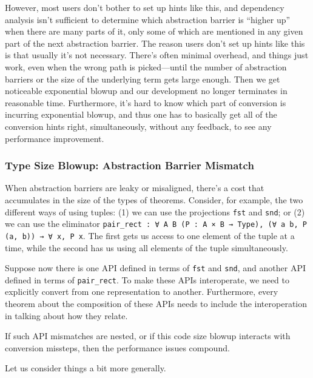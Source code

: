 However, most users don't bother to set up hints like this, and dependency analysis isn't sufficient to determine which abstraction barrier is ``higher up'' when there are many parts of it, only some of which are mentioned in any given part of the next abstraction barrier.
The reason users don't set up hints like this is that usually it's not necessary.
There's often minimal overhead, and things just work, even when the wrong path is picked---until the number of abstraction barriers or the size of the underlying term gets large enough.
Then we get noticeable exponential blowup and our development no longer terminates in reasonable time.
Furthermore, it's hard to know which part of conversion is incurring exponential blowup, and thus one has to basically get all of the conversion hints right, simultaneously, without any feedback, to see any performance improvement.



\subsubsection{Type Size Blowup: Abstraction Barrier Mismatch} \label{sec:abstraction-barriers:mismatch}
When abstraction barriers are leaky or misaligned, there's a cost that accumulates in the size of the types of theorems.
Consider, for example, the two different ways of using tuples:
(1) we can use the projections \texttt{fst} and \texttt{snd}; or
(2) we can use the eliminator \texttt{pair_rect : ∀ A B (P : A × B → Type), (∀ a b, P (a, b)) → ∀ x, P x}.
The first gets us access to one element of the tuple at a time, while the second has us using all elements of the tuple simultaneously.

Suppose now there is one API defined in terms of \texttt{fst} and \texttt{snd}, and another API defined in terms of \texttt{pair_rect}.
To make these APIs interoperate, we need to explicitly convert from one representation to another.
Furthermore, every theorem about the composition of these APIs needs to include the interoperation in talking about how they relate.

If such API mismatches are nested, or if this code size blowup interacts with conversion missteps, then the performance issues compound.



\label{sec:abstraction-barriers:mismatch:example:exponential-laws:main-text}
Let us consider things a bit more generally.

